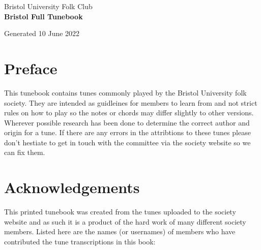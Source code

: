 \documentclass[12pt,a4paper,twoside]{article}
\makeatletter
\newcommand{\thetitle}{Bristol Full Tunebook}
\newcommand{\thedate}{10 June 2022}
\renewcommand\tableofcontents{%
    \begin{multicols}{2}[
      \centering
      \section*{\large\contentsname
        \@mkboth{%
           \MakeUppercase\contentsname}{\MakeUppercase\contentsname}}]
    \@starttoc{toc}%
    \end{multicols}
}
\makeatother
\begin{document}
\begin{titlepage}
   \begin{center}
       \large Bristol University Folk Club \\

       \vspace{4cm}
       \textbf{\Huge \thetitle}

       \vspace{0.5cm}
       Generated \thedate

       \vspace{1.5cm}

       \vfill

   \end{center}
\end{titlepage}

\tableofcontents

\section{Preface}

This tunebook contains tunes commonly played by the Bristol University folk society. They are intended as guidleines for members to learn from and not strict rules on how to play so the notes or chords may differ slightly to other versions.
Wherever possible research has been done to determine the correct author and origin for a tune. If there are any errors in the attribtions to these tunes please don't hestiate to get in touch with the committee via the society website so we can fix them.

\section{Acknowledgements}

This printed tunebook was created from the tunes uploaded to the society website and as such it is a product of the hard work of many different society members. Listed here are the names (or usernames) of members who have contributed the tune transcriptions in this book:
\end{document}
